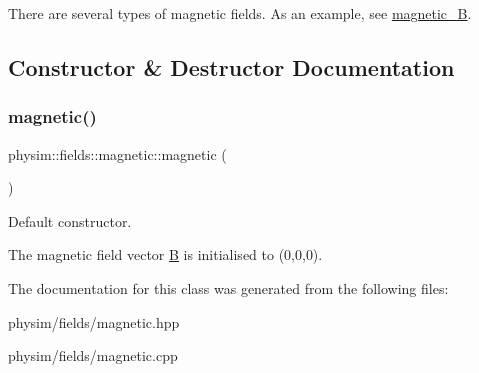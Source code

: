 There are several types of magnetic fields. As an example, see \hyperlink{classphysim_1_1fields_1_1magnetic__B}{magnetic\+\_\+B}. 

\subsection{Constructor \& Destructor Documentation}
\mbox{\label{classphysim_1_1fields_1_1magnetic_a4bc1ebfece31aa73f3242850314dcaac}} 
\subsubsection{\texorpdfstring{magnetic()}{magnetic()}}
{\footnotesize\ttfamily physim\+::fields\+::magnetic\+::magnetic (\begin{DoxyParamCaption}{ }\end{DoxyParamCaption})}



Default constructor. 

The magnetic field vector \hyperlink{classphysim_1_1fields_1_1magnetic_a9955f0d4a3773ff96b536f37623b5ac7}{B} is initialised to (0,0,0). 

The documentation for this class was generated from the following files\+:\begin{DoxyCompactItemize}
\item 
physim/fields/magnetic.\+hpp\item 
physim/fields/magnetic.\+cpp\end{DoxyCompactItemize}
